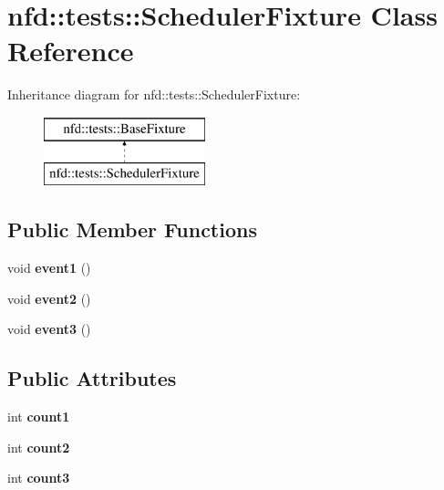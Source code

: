 \hypertarget{classnfd_1_1tests_1_1SchedulerFixture}{}\section{nfd\+:\+:tests\+:\+:Scheduler\+Fixture Class Reference}
\label{classnfd_1_1tests_1_1SchedulerFixture}
Inheritance diagram for nfd\+:\+:tests\+:\+:Scheduler\+Fixture\+:\begin{figure}[H]
\begin{center}
\leavevmode
\includegraphics[height=2.000000cm]{classnfd_1_1tests_1_1SchedulerFixture}
\end{center}
\end{figure}
\subsection*{Public Member Functions}
\begin{DoxyCompactItemize}
\item 
void {\bfseries event1} ()\hypertarget{classnfd_1_1tests_1_1SchedulerFixture_a0cb6e6e6c63e3e49367db35cd262440b}{}\label{classnfd_1_1tests_1_1SchedulerFixture_a0cb6e6e6c63e3e49367db35cd262440b}

\item 
void {\bfseries event2} ()\hypertarget{classnfd_1_1tests_1_1SchedulerFixture_ab04c6c2e2867d34fbe43d2e22ed6ead1}{}\label{classnfd_1_1tests_1_1SchedulerFixture_ab04c6c2e2867d34fbe43d2e22ed6ead1}

\item 
void {\bfseries event3} ()\hypertarget{classnfd_1_1tests_1_1SchedulerFixture_a4322a5b41a3c7569be6dc96941a708b1}{}\label{classnfd_1_1tests_1_1SchedulerFixture_a4322a5b41a3c7569be6dc96941a708b1}

\end{DoxyCompactItemize}
\subsection*{Public Attributes}
\begin{DoxyCompactItemize}
\item 
int {\bfseries count1}\hypertarget{classnfd_1_1tests_1_1SchedulerFixture_a74cd231b117bab7ad1d4e3f98f172f02}{}\label{classnfd_1_1tests_1_1SchedulerFixture_a74cd231b117bab7ad1d4e3f98f172f02}

\item 
int {\bfseries count2}\hypertarget{classnfd_1_1tests_1_1SchedulerFixture_a41d3d16187e968886f37ab4f9a9280e8}{}\label{classnfd_1_1tests_1_1SchedulerFixture_a41d3d16187e968886f37ab4f9a9280e8}

\item 
int {\bfseries count3}\hypertarget{classnfd_1_1tests_1_1SchedulerFixture_a36cc0aeab46af90d10c8c6cb25f83bcb}{}\label{classnfd_1_1tests_1_1SchedulerFixture_a36cc0aeab46af90d10c8c6cb25f83bcb}

\end{DoxyCompactItemize}
